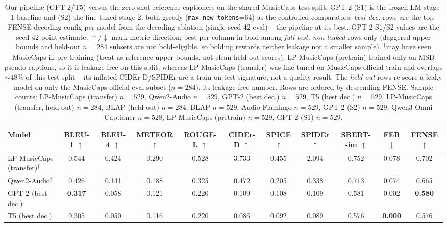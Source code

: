 \begin{table}[t]
\centering
\small
\setlength{\tabcolsep}{4pt}
\caption{Our pipeline (GPT-2/T5) versus the zero-shot reference captioners on the
shared MusicCaps test split. GPT-2 (S1) is the frozen-LM stage-1 baseline and (S2)
the fine-tuned stage-2, both greedy (\texttt{max\_new\_tokens}=64) as the controlled
comparators; \emph{best dec.} rows are the top-FENSE decoding config per model from
the decoding ablation (single seed-42 eval) -- the pipeline at its best. GPT-2
S1/S2 values are the seed-42 point estimate. $\uparrow$/$\downarrow$ mark metric
direction; best per column in bold among \emph{full-test, non-leaked} rows only
(daggered upper bounds and held-out $n{=}284$ subsets are not bold-eligible, so
bolding rewards neither leakage nor a smaller sample). $^{\dagger}$may have seen MusicCaps in pre-training (treat as
reference upper bounds, not clean held-out scores); LP-MusicCaps (pretrain) trained
only on MSD pseudo-captions, so it is leakage-free on this split, whereas LP-MusicCaps
(transfer) was fine-tuned on MusicCaps official-train and overlaps ${\sim}48\%$ of
this test split -- its inflated CIDEr-D/SPIDEr are a train-on-test signature, not a
quality result. The \emph{held-out} rows re-score a leaky model on only the
MusicCaps-official-eval subset ($n{=}284$), its leakage-free number. Rows are ordered by
descending FENSE. Sample counts:
LP-MusicCaps (transfer) $n{=}529$, Qwen2-Audio $n{=}529$, GPT-2 (best dec.) $n{=}529$, T5 (best dec.) $n{=}529$, LP-MusicCaps (transfer, held-out) $n{=}284$, BLAP (held-out) $n{=}284$, BLAP $n{=}529$, Audio Flamingo $n{=}529$, GPT-2 (S2) $n{=}529$, Qwen3-Omni Captioner $n{=}528$, LP-MusicCaps (pretrain) $n{=}529$, GPT-2 (S1) $n{=}529$.}
\label{tab:reference-comparison}
\begin{tabular}{lcccccccccc}
\toprule
Model & BLEU-1 $\uparrow$ & BLEU-4 $\uparrow$ & METEOR $\uparrow$ & ROUGE-L $\uparrow$ & CIDEr-D $\uparrow$ & SPICE $\uparrow$ & SPIDEr $\uparrow$ & SBERT-sim $\uparrow$ & FER $\downarrow$ & FENSE $\uparrow$ \\
\midrule
LP-MusicCaps (transfer)$^{\dagger}$ & 0.544 & 0.424 & 0.290 & 0.528 & 3.733 & 0.455 & 2.094 & 0.752 & 0.078 & 0.702 \\
Qwen2-Audio$^{\dagger}$ & 0.426 & 0.141 & 0.188 & 0.325 & 0.472 & 0.205 & 0.338 & 0.713 & 0.074 & 0.665 \\
GPT-2 (best dec.) & \textbf{0.317} & 0.058 & 0.121 & 0.220 & 0.109 & 0.108 & 0.109 & 0.581 & 0.002 & \textbf{0.580} \\
T5 (best dec.) & 0.305 & 0.050 & 0.116 & 0.220 & 0.086 & 0.092 & 0.089 & 0.576 & \textbf{0.000} & 0.576 \\

\end{tabular}
\end{table}
